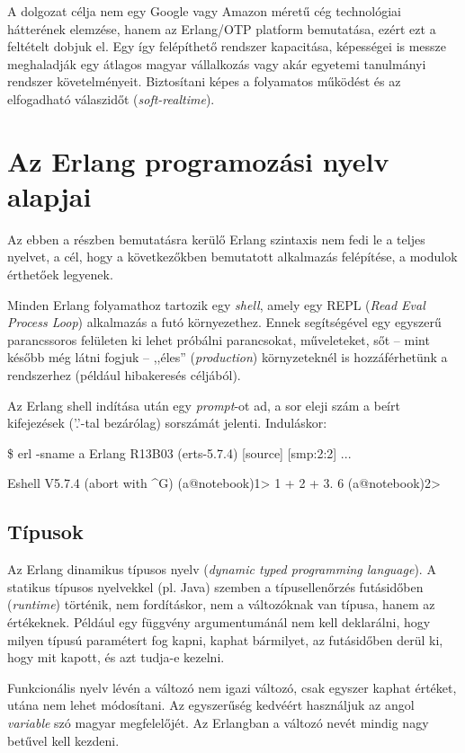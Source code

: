 \documentclass[12pt, a4paper, oneside]{book}
\begin{document}
A dolgozat célja nem egy Google vagy Amazon méretű cég technológiai hátterének
elemzése, hanem az Erlang/OTP platform bemutatása, ezért ezt a feltételt dobjuk
el. Egy így felépíthető rendszer kapacitása, képességei is messze meghaladják
egy átlagos magyar vállalkozás vagy akár egyetemi tanulmányi rendszer
követelményeit. Biztosítani képes a folyamatos működést és az elfogadható
válaszidőt (\emph{soft-realtime}).

\chapter{Az Erlang programozási nyelv alapjai} 
Az ebben a részben bemutatásra kerülő Erlang szintaxis nem fedi le a teljes
nyelvet, a cél, hogy a következőkben bemutatott alkalmazás felépítése, a
modulok érthetőek legyenek.

Minden Erlang folyamathoz tartozik egy \emph{shell}, amely egy REPL (\emph{Read
Eval Process Loop}) alkalmazás a futó környezethez. Ennek segítségével egy
egyszerű parancssoros felületen ki lehet próbálni parancsokat, műveleteket, sőt
-- mint később még látni fogjuk -- ,,éles'' (\emph{production}) környzeteknél
is hozzáférhetünk a rendszerhez (például hibakeresés céljából).

Az Erlang shell indítása után egy \emph{prompt}-ot ad, a sor eleji szám a
beírt kifejezések ('.'-tal bezárólag) sorszámát jelenti. Induláskor:

\begin{code}{}{}
\$ erl -sname a
Erlang R13B03 (erts-5.7.4) [source] [smp:2:2] ...

Eshell V5.7.4  (abort with ^G)
(a@notebook)1> 1 + 2 + 3.
6
(a@notebook)2>
\end{code}

\section{Típusok} Az Erlang dinamikus típusos nyelv (\emph{dynamic typed
programming language}).  A statikus típusos nyelvekkel (pl. Java) szemben a
típusellenőrzés futásidőben (\emph{runtime}) történik, nem fordításkor, nem a
változóknak van típusa, hanem az értékeknek.  Például egy függvény
argumentumánál nem kell deklarálni, hogy milyen típusú paramétert fog kapni,
kaphat bármilyet, az futásidőben derül ki, hogy mit kapott, és azt tudja-e
kezelni. 

Funkcionális nyelv lévén a változó nem igazi változó, csak egyszer kaphat
értéket, utána nem lehet módosítani. Az egyszerűség kedvéért használjuk az
angol \emph{variable} szó magyar megfelelőjét. Az Erlangban a változó nevét
mindig nagy betűvel kell kezdeni.
\end{document}
